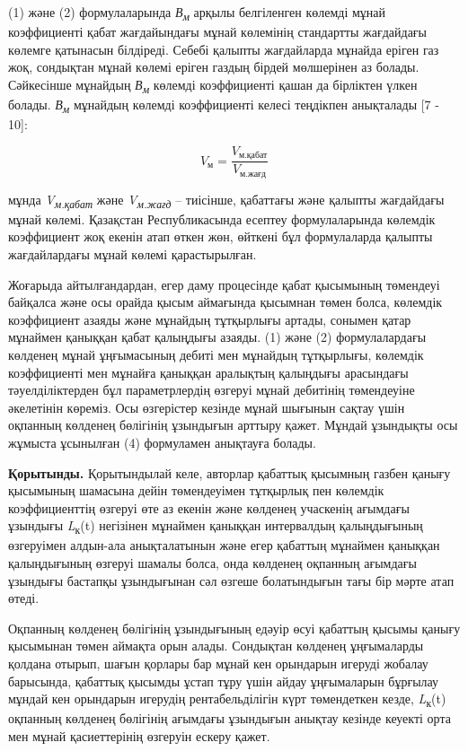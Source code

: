 \begin{multicols}{2}

(1) және (2) формулаларында \emph{В\textsubscript{м}} арқылы белгіленген
көлемді мұнай коэффициенті қабат жағдайындағы мұнай көлемінің стандартты
жағдайдағы көлемге қатынасын білдіреді. Себебі қалыпты жағдайларда
мұнайда еріген газ жоқ, сондықтан мұнай көлемі еріген газдың бірдей
мөлшерінен аз болады. Сәйкесінше мұнайдың \emph{В\textsubscript{м}}
көлемді коэффициенті қашан да бірліктен үлкен болады.
\emph{В\textsubscript{м}} мұнайдың көлемді коэффициенті келесі теңдікпен
анықталады {[}7 - 10{]}:

\begin{equation}
    V_{\text{м}} = \frac{V_{\text{м.қабат}}}{V_{\text{м.жағд}}}
    \end{equation}
    

мұнда \emph{V\textsubscript{м.қабат}} және
\emph{V\textsubscript{м.жағд}} -- тиісінше, қабаттағы және қалыпты
жағдайдағы мұнай көлемі. Қазақстан Республикасында есептеу
формулаларында көлемдік коэффициент жоқ екенін атап өткен жөн, өйткені
бұл формулаларда қалыпты жағдайлардағы мұнай көлемі қарастырылған.

Жоғарыда айтылғандардан, егер даму процесінде қабат қысымының төмендеуі
байқалса және осы орайда қысым аймағында қысымнан төмен болса, көлемдік
коэффициент азаяды және мұнайдың тұтқырлығы артады, сонымен қатар
мұнаймен қаныққан қабат қалыңдығы азаяды. (1) және (2) формулалардағы
көлденең мұнай ұңғымасының дебиті мен мұнайдың тұтқырлығы, көлемдік
коэффициенті мен мұнайға қаныққан аралықтың қалыңдығы арасындағы
тәуелділіктерден бұл параметрлердің өзгеруі мұнай дебитінің төмендеуіне
әкелетінін көреміз. Осы өзгерістер кезінде мұнай шығынын сақтау үшін
оқпанның көлденең бөлігінің ұзындығын арттыру қажет. Мұндай ұзындықты
осы жұмыста ұсынылған (4) формуламен анықтауға болады.

{\bfseries Қорытынды.} Қорытындылай келе, авторлар қабаттық қысымның газбен
қанығу қысымының шамасына дейін төмендеуімен тұтқырлық пен көлемдік
коэффициенттің өзгеруі өте аз екенін және көлденең учаскенің ағымдағы
ұзындығы \emph{L}\textsubscript{к}(t) негізінен мұнаймен қаныққан
интервалдың қалыңдығының өзгеруімен алдын-ала анықталатынын және егер
қабаттың мұнаймен қаныққан қалыңдығының өзгеруі шамалы болса, онда
көлденең оқпанның ағымдағы ұзындығы бастапқы ұзындығынан сәл өзгеше
болатындығын тағы бір мәрте атап өтеді.

Оқпанның көлденең бөлігінің ұзындығының едәуір өсуі қабаттың қысымы
қанығу қысымынан төмен аймақта орын алады. Сондықтан көлденең
ұңғымаларды қолдана отырып, шағын қорлары бар мұнай кен орындарын
игеруді жобалау барысында, қабаттық қысымды ұстап тұру үшін айдау
ұңғымаларын бұрғылау мұндай кен орындарын игерудің рентабельділігін күрт
төмендеткен кезде, \emph{L}\textsubscript{к}(t) оқпанның көлденең
бөлігінің ағымдағы ұзындығын анықтау кезінде кеуекті орта мен мұнай
қасиеттерінің өзгеруін ескеру қажет.


\end{multicols}
